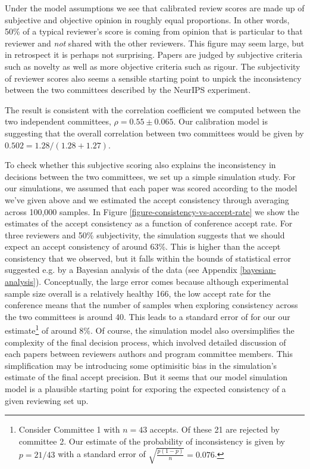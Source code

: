 \documentclass[twoside]{article}
\begin{document}
Under the model assumptions we see that calibrated review scores are
made up of subjective and objective opinion in roughly equal
proportions. In other words, 50\% of a typical reviewer's score is
coming from opinion that is particular to that reviewer and \emph{not}
shared with the other reviewers. This figure may seem large, but in
retrospect it is perhaps not surprising. Papers are judged by
subjective criteria such as novelty as well as more objective criteria
such as rigour. The subjectivity of reviewer scores also seems a
sensible starting point to unpick the inconsistency between the two
committees described by the NeurIPS experiment. 


The result is consistent with the correlation coefficient we computed
between the two independent committees, $\rho = 0.55 \pm 0.065$. Our
calibration model is suggesting that the overall correlation between
two committees would be given by $0.502 = 1.28/(1.28+1.27)$.

To check whether this subjective scoring also explains the
inconsistency in decisions between the two committees, we set up a
simple simulation study. For our simulations, we assumed that each
paper was scored according to the model we've given above and we
estimated the accept consistency through averaging across 100,000
samples. In Figure \ref{figure-consistency-vs-accept-rate} we show the
estimates of the accept consistency as a function of conference accept
rate. For three reviewers and 50\% subjectivity, the simulation
suggests that we should expect an accept consistency of around
63\%. This is higher than the accept consistency that we
observed, but it falls within the bounds of statistical error suggested e.g. by
a Bayesian analysis of the data (see Appendix \ref{bayesian-analysis}). Conceptually, the large error comes because although experimental sample size overall is a relatively healthy 166, the low accept rate for the conference means that the number of samples when exploring consistency across the two committees is around 40. This leads to a standard error of for our our estimate\footnote{Consider Committee 1 with $n=43$ accepts. Of these 21 are rejected by committee 2. Our estimate of the probability of inconsistency is given by $p=21/43$ with a standard error of $\sqrt{\frac{p(1-p)}{n}} = 0.076$.} of around 8\%.
Of course, the simulation model also oversimplifies the complexity of the final decision process, which involved detailed discussion of each papers between reviewers authors and program committee members. This simplification may be introducing some optimisitic bias in the simulation's estimate of the final accept precision. But it seems that our model simulation model is a plausible starting point for exporing the expected consistency of a given reviewing set up.
\end{document}
